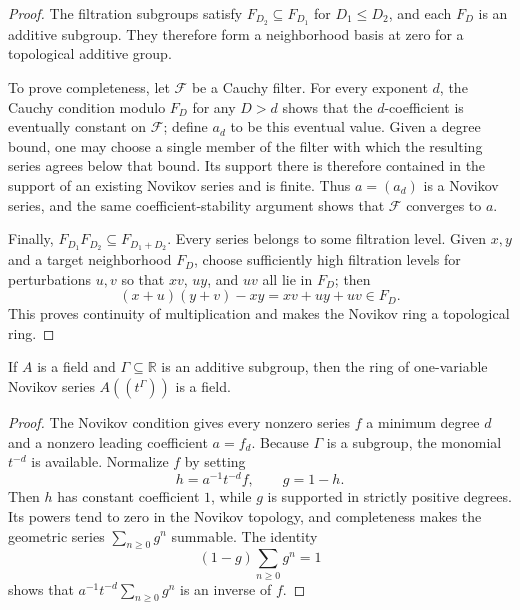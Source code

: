 \begin{proof}
  \leanok
  The filtration subgroups satisfy $F_{D_2}\subseteq F_{D_1}$ for
  $D_1\le D_2$, and each $F_D$ is an additive subgroup.  They therefore form a
  neighborhood basis at zero for a topological additive group.

  To prove completeness, let $\mathcal F$ be a Cauchy filter.  For every
  exponent $d$, the Cauchy condition modulo $F_D$ for any $D>d$ shows that the
  $d$-coefficient is eventually constant on $\mathcal F$; define $a_d$ to be
  this eventual value.  Given a degree bound, one may choose a single member
  of the filter with which the resulting series agrees below that bound.
  Its support there is therefore contained in the support of an existing
  Novikov series and is finite.  Thus $a=(a_d)$ is a Novikov series, and the
  same coefficient-stability argument shows that $\mathcal F$ converges to
  $a$.

  Finally, $F_{D_1}F_{D_2}\subseteq F_{D_1+D_2}$.  Every series belongs to
  some filtration level.  Given $x,y$ and a target neighborhood $F_D$, choose
  sufficiently high filtration levels for perturbations $u,v$ so that
  $xv$, $uy$, and $uv$ all lie in $F_D$; then
  \[
    (x+u)(y+v)-xy=xv+uy+uv\in F_D.
  \]
  This proves continuity of multiplication and makes the Novikov ring a
  topological ring.
\end{proof}

\begin{theorem}
  \label{thm:novikov_field}
  \leanok
  If $A$ is a field and $\Gamma\subseteq\mathbb{R}$ is an additive subgroup,
  then the ring of one-variable Novikov series $A((t^\Gamma))$ is a field.
\end{theorem}

\begin{proof}
  \leanok
  The Novikov condition gives every nonzero series $f$ a minimum degree $d$
  and a nonzero leading coefficient $a=f_d$.  Because $\Gamma$ is a subgroup,
  the monomial $t^{-d}$ is available.  Normalize $f$ by setting
  \[
    h=a^{-1}t^{-d}f,\qquad g=1-h.
  \]
  Then $h$ has constant coefficient $1$, while $g$ is supported in strictly
  positive degrees.  Its powers tend to zero in the Novikov topology, and
  completeness makes the geometric series $\sum_{n\ge0}g^n$ summable.  The
  identity
  \[
    (1-g)\sum_{n\ge0}g^n=1
  \]
  shows that
  $a^{-1}t^{-d}\sum_{n\ge0}g^n$ is an inverse of $f$.
\end{proof}

